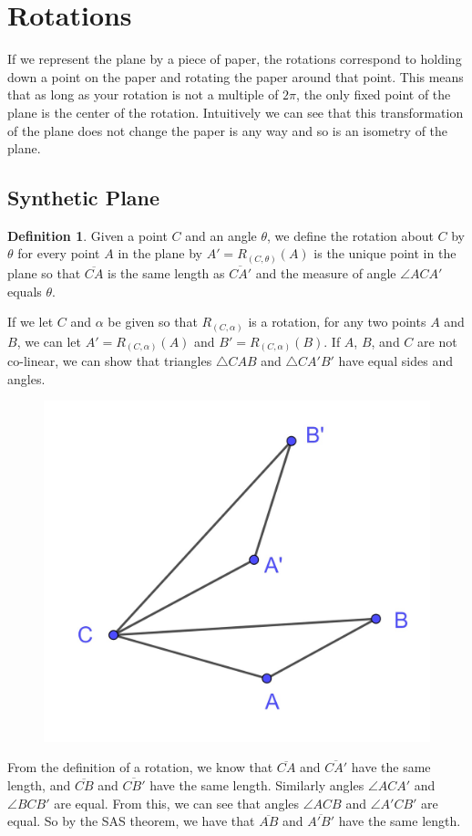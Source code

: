 \documentclass[
]{book}
\theoremstyle{definition}
\newtheorem{definition}{Definition}[chapter]
\theoremstyle{definition}
\theoremstyle{definition}
\theoremstyle{definition}
\theoremstyle{remark}
\begin{document}
\hypertarget{rotations}{%
\section{Rotations}\label{rotations}}

If we represent the plane by a piece of paper, the rotations correspond to holding down a point on the paper and rotating the paper around that point. This means that as long as your rotation is not a multiple of \(2\pi\), the only fixed point of the plane is the center of the rotation. Intuitively we can see that this transformation of the plane does not change the paper is any way and so is an isometry of the plane.

\hypertarget{synthetic-plane-2}{%
\subsection{Synthetic Plane}\label{synthetic-plane-2}}

\begin{definition}
Given a point \(C\) and an angle \(\theta\), we define the rotation about \(C\) by \(\theta\) for every point \(A\) in the plane by \(A'=R_{(C,\theta)}(A)\) is the unique point in the plane so that \(\overline{CA}\) is the same length as \(\overline{CA'}\) and the measure of angle \(\angle ACA'\) equals \(\theta\).
\end{definition}

If we let \(C\) and \(\alpha\) be given so that \(R_{(C,\alpha)}\) is a rotation, for any two points \(A\) and \(B\), we can let \(A'=R_{(C,\alpha)}(A)\) and \(B'=R_{(C,\alpha)}(B)\). If \(A\), \(B\), and \(C\) are not co-linear, we can show that triangles \(\triangle CAB\) and \(\triangle CA'B'\) have equal sides and angles.

\begin{figure}

{\centering \includegraphics[width=0.3\linewidth]{images/Rotation_synthetic} 

}

\end{figure}

From the definition of a rotation, we know that \(\overline{CA}\) and \(\overline{CA'}\) have the same length, and \(\overline{CB}\) and \(\overline{CB'}\) have the same length. Similarly angles \(\angle ACA'\) and \(\angle BCB'\) are equal. From this, we can see that angles \(\angle ACB\) and \(\angle A'CB'\) are equal. So by the SAS theorem, we have that \(\overline{AB}\) and \(\overline{A'B'}\) have the same length.
\end{document}
